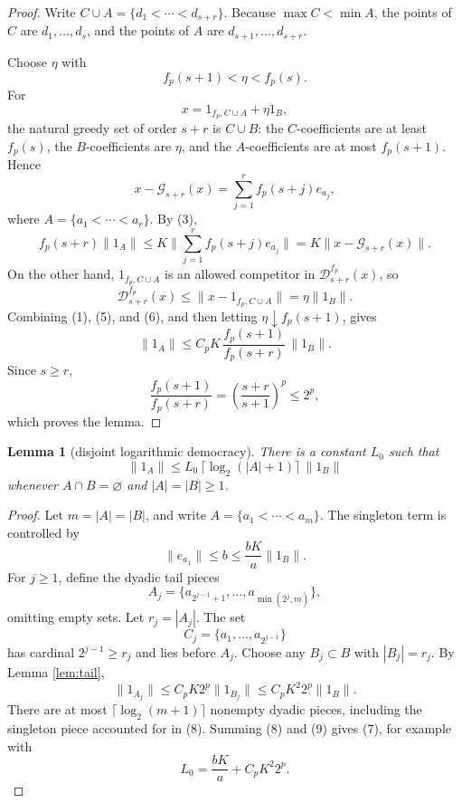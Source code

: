 \documentclass[11pt]{article}
\newtheorem{lemma}{Lemma}
\theoremstyle{definition}
\newcommand{\calG}{\mathcal G}
\newcommand{\calD}{\mathcal D}
\newcommand{\fp}{f_p}
\begin{document}
\begin{proof}
Write \(C\cup A=\{d_1<\cdots<d_{s+r}\}\).  Because \(\max C<\min A\), the
points of \(C\) are \(d_1,\ldots,d_s\), and the points of \(A\) are
\(d_{s+1},\ldots,d_{s+r}\).

Choose \(\eta\) with
\[
        \fp(s+1)<\eta<\fp(s).
\]
For
\[
        x=1_{\fp,C\cup A}+\eta 1_B,
\]
the natural greedy set of order \(s+r\) is \(C\cup B\): the \(C\)-coefficients
are at least \(\fp(s)\), the \(B\)-coefficients are \(\eta\), and the
\(A\)-coefficients are at most \(\fp(s+1)\).  Hence
\[
        x-\calG_{s+r}(x)
        =\sum_{j=1}^r \fp(s+j)e_{a_j},
\]
where \(A=\{a_1<\cdots<a_r\}\).  By (3),
\[
        \fp(s+r)\|1_A\|
        \le
        K\Big\|\sum_{j=1}^r \fp(s+j)e_{a_j}\Big\|
        =
        K\|x-\calG_{s+r}(x)\|.
        \tag{5}
\]
On the other hand, \(1_{\fp,C\cup A}\) is an allowed competitor in
\(\calD_{s+r}^{\fp}(x)\), so
\[
        \calD_{s+r}^{\fp}(x)
        \le \|x-1_{\fp,C\cup A}\|
        = \eta\|1_B\|.
        \tag{6}
\]
Combining (1), (5), and (6), and then letting
\(\eta\downarrow \fp(s+1)\), gives
\[
        \|1_A\|
        \le C_pK\,\frac{\fp(s+1)}{\fp(s+r)}\,\|1_B\|.
\]
Since \(s\ge r\),
\[
        \frac{\fp(s+1)}{\fp(s+r)}
        =
        \left(\frac{s+r}{s+1}\right)^p
        \le 2^p,
\]
which proves the lemma.
\end{proof}

\begin{lemma}[disjoint logarithmic democracy]\label{lem:disjoint}
There is a constant \(L_0\) such that
\[
        \|1_A\|\le L_0\,\lceil\log_2(|A|+1)\rceil\,\|1_B\|
        \tag{7}
\]
whenever \(A\cap B=\varnothing\) and \(|A|=|B|\ge 1\).
\end{lemma}

\begin{proof}
Let \(m=|A|=|B|\), and write \(A=\{a_1<\cdots<a_m\}\).  The singleton term is
controlled by
\[
        \|e_{a_1}\|\le b\le \frac{bK}{a}\|1_B\|.
        \tag{8}
\]
For \(j\ge1\), define the dyadic tail pieces
\[
        A_j=\{a_{2^{j-1}+1},\ldots,a_{\min(2^j,m)}\},
\]
omitting empty sets.  Let \(r_j=|A_j|\).  The set
\[
        C_j=\{a_1,\ldots,a_{2^{j-1}}\}
\]
has cardinal \(2^{j-1}\ge r_j\) and lies before \(A_j\).  Choose any
\(B_j\subset B\) with \(|B_j|=r_j\).  By Lemma \ref{lem:tail},
\[
        \|1_{A_j}\|\le C_pK2^p\|1_{B_j}\|
        \le C_pK^2 2^p\|1_B\|.
        \tag{9}
\]
There are at most \(\lceil\log_2(m+1)\rceil\) nonempty dyadic pieces, including
the singleton piece accounted for in (8).  Summing (8) and (9) gives (7), for
example with
\[
        L_0=\frac{bK}{a}+C_pK^2 2^p .
\]
\end{proof}
\end{document}
